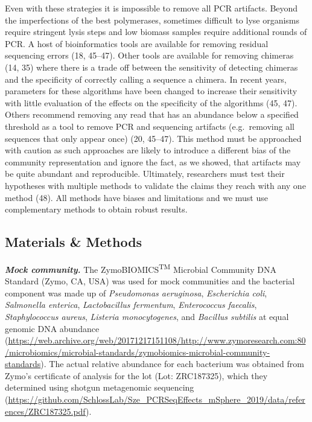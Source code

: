 \documentclass[11pt,]{article}
\begin{document}
Even with these strategies it is impossible to remove all PCR artifacts.
Beyond the imperfections of the best polymerases, sometimes difficult to
lyse organisms require stringent lysis steps and low biomass samples
require additional rounds of PCR. A host of bioinformatics tools are
available for removing residual sequencing errors (18, 45--47). Other
tools are available for removing chimeras (14, 35) where there is a
trade off between the sensitivity of detecting chimeras and the
specificity of correctly calling a sequence a chimera. In recent years,
parameters for these algorithms have been changed to increase their
sensitivity with little evaluation of the effects on the specificity of
the algorithms (45, 47). Others recommend removing any read that has an
abundance below a specified threshold as a tool to remove PCR and
sequencing artifacts (e.g.~removing all sequences that only appear once)
(20, 45--47). This method must be approached with caution as such
approaches are likely to introduce a different bias of the community
representation and ignore the fact, as we showed, that artifacts may be
quite abundant and reproducible. Ultimately, researchers must test their
hypotheses with multiple methods to validate the claims they reach with
any one method (48). All methods have biases and limitations and we must
use complementary methods to obtain robust results.

\newpage

\hypertarget{materials-methods}{%
\subsection{Materials \& Methods}\label{materials-methods}}

\textbf{\emph{Mock community.}} The ZymoBIOMICS\textsuperscript{TM}
Microbial Community DNA Standard (Zymo, CA, USA) was used for mock
communities and the bacterial component was made up of \emph{Pseudomonas
aeruginosa}, \emph{Escherichia coli}, \emph{Salmonella enterica},
\emph{Lactobacillus fermentum}, \emph{Enterococcus faecalis},
\emph{Staphylococcus aureus}, \emph{Listeria monocytogenes}, and
\emph{Bacillus subtilis} at equal genomic DNA abundance
(\url{https://web.archive.org/web/20171217151108/http://www.zymoresearch.com:80/microbiomics/microbial-standards/zymobiomics-microbial-community-standards}).
The actual relative abundance for each bacterium was obtained from
Zymo's certificate of analysis for the lot (Lot: ZRC187325), which they
determined using shotgun metagenomic sequencing
(\url{https://github.com/SchlossLab/Sze_PCRSeqEffects_mSphere_2019/data/references/ZRC187325.pdf}).
\end{document}
